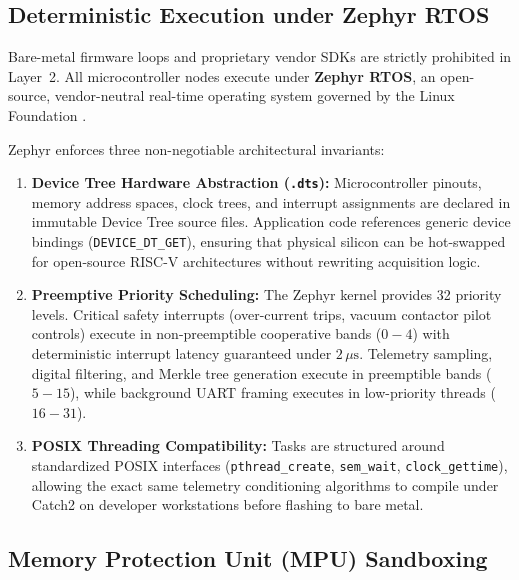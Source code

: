 \subsection{Deterministic Execution under Zephyr RTOS}

Bare-metal firmware loops and proprietary vendor SDKs are strictly prohibited in Layer~2. All microcontroller nodes execute under \textbf{Zephyr RTOS}, an open-source, vendor-neutral real-time operating system governed by the Linux Foundation \parencite{zephyr2024}.

Zephyr enforces three non-negotiable architectural invariants:
\begin{enumerate}
    \item \textbf{Device Tree Hardware Abstraction (\texttt{.dts}):} Microcontroller pinouts, memory address spaces, clock trees, and interrupt assignments are declared in immutable Device Tree source files. Application code references generic device bindings (\texttt{DEVICE\_DT\_GET}), ensuring that physical silicon can be hot-swapped for open-source RISC-V architectures without rewriting acquisition logic.
    \item \textbf{Preemptive Priority Scheduling:} The Zephyr kernel provides 32 priority levels. Critical safety interrupts (over-current trips, vacuum contactor pilot controls) execute in non-preemptible cooperative bands ($0-4$) with deterministic interrupt latency guaranteed under $2\,\mu\mathrm{s}$. Telemetry sampling, digital filtering, and Merkle tree generation execute in preemptible bands ($5-15$), while background UART framing executes in low-priority threads ($16-31$).
    \item \textbf{POSIX Threading Compatibility:} Tasks are structured around standardized POSIX interfaces (\texttt{pthread\_create}, \texttt{sem\_wait}, \texttt{clock\_gettime}), allowing the exact same telemetry conditioning algorithms to compile under Catch2 on developer workstations before flashing to bare metal.
\end{enumerate}

\subsection{Memory Protection Unit (MPU) Sandboxing}

